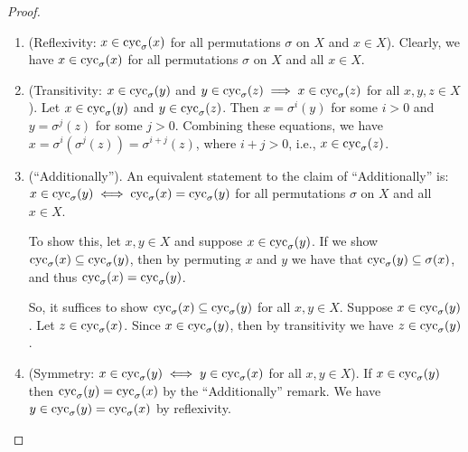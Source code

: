 \begin{proof}
    \mbox{} \\
    \begin{enumerate}
        \item (Reflexivity: $x \in \text{cyc}_\sigma(x)$ for all permutations $\sigma$ on $X$ and $x \in X$). Clearly, we have $x \in \text{cyc}_\sigma(x)$ for all permutations $\sigma$ on $X$ and all $x \in X$.

        \item (Transitivity: $x \in \text{cyc}_\sigma(y)$ and $y \in \text{cyc}_\sigma(z) \implies x \in \text{cyc}_\sigma(z)$ for all $x, y, z \in X$). Let $x \in \text{cyc}_\sigma(y)$ and $y \in \text{cyc}_\sigma(z)$. Then $x = \sigma^i(y)$ for some $i > 0$ and $y = \sigma^j(z)$ for some $j > 0$. Combining these equations, we have $x = \sigma^i(\sigma^j(z)) = \sigma^{i + j}(z)$, where $i + j > 0$, i.e., $x \in \text{cyc}_\sigma(z)$.

        \item (``Additionally''). An equivalent statement to the claim of ``Additionally'' is: $x \in \text{cyc}_\sigma(y) \iff \text{cyc}_\sigma(x) = \text{cyc}_\sigma(y)$ for all permutations $\sigma$ on $X$ and all $x \in X$.
        
        To show this, let $x, y \in X$ and suppose $x \in \text{cyc}_\sigma(y)$. If we show $\text{cyc}_\sigma(x) \subseteq \text{cyc}_\sigma(y)$, then by permuting $x$ and $y$ we have that $\text{cyc}_\sigma(y) \subseteq \sigma(x)$, and thus $\text{cyc}_\sigma(x) = \text{cyc}_\sigma(y)$. 
        
        So, it suffices to show $\text{cyc}_\sigma(x) \subseteq \text{cyc}_\sigma(y)$ for all $x, y \in X$. Suppose $x \in \text{cyc}_\sigma(y)$. Let $z \in \text{cyc}_\sigma(x)$. Since $x \in \text{cyc}_\sigma(y)$, then by transitivity we have $z \in \text{cyc}_\sigma(y)$.
        
        \item (Symmetry: $x \in \text{cyc}_\sigma(y) \iff y \in \text{cyc}_\sigma(x)$ for all $x, y \in X$). If $x \in \text{cyc}_\sigma(y)$ then $\text{cyc}_\sigma(y) = \text{cyc}_\sigma(x)$ by the ``Additionally'' remark. We have $y \in \text{cyc}_\sigma(y) = \text{cyc}_\sigma(x)$ by reflexivity.
    \end{enumerate}
\end{proof}

